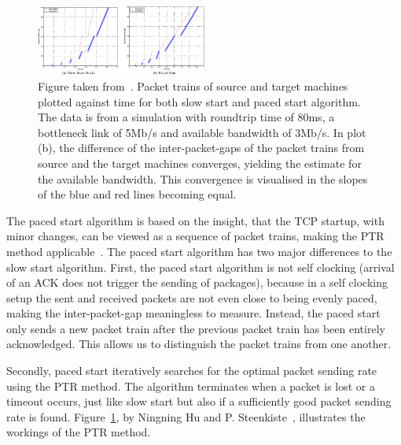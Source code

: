\begin{figure}
	\includegraphics[width=0.5\textwidth]{images/hu03_PTR.png}
	\caption{Figure taken from~\cite{Hu03}. Packet trains of source and target machines plotted against time for both slow start and paced start algorithm. The data is from a simulation with roundtrip time of 80ms, a bottleneck link of 5Mb/s and available bandwidth of 3Mb/s. In plot (b), the difference of the inter-packet-gaps of the packet trains from source and the target machines converges, yielding the estimate for the available bandwidth. This convergence is visualised in the slopes of the blue and red lines becoming equal.}
	\label{fig:PTR}
\end{figure}
The paced start algorithm is based on the insight, that the TCP startup, with minor changes, can be viewed as a sequence of packet trains, making the PTR method applicable~\cite{Hu03}. The paced start algorithm has two major differences to the slow start algorithm. First, the paced start algorithm is not self clocking (arrival of an ACK does not trigger the sending of packages), because in a self clocking setup the sent and received packets are not even close to being evenly paced, making the inter-packet-gap meaningless to measure. Instead, the paced start only sends a new packet train after the previous packet train has been entirely acknowledged. This allows us to distinguish the packet trains from one another. 

Secondly, paced start iteratively searches for the optimal packet sending rate using the PTR method. The algorithm terminates when a packet is lost or a timeout occurs, just like slow start but also if a sufficiently good packet sending rate is found. Figure~\ref{fig:PTR}, by Ningning Hu and P. Steenkiste~\cite{Hu03}, illustrates the workings of the PTR method.

